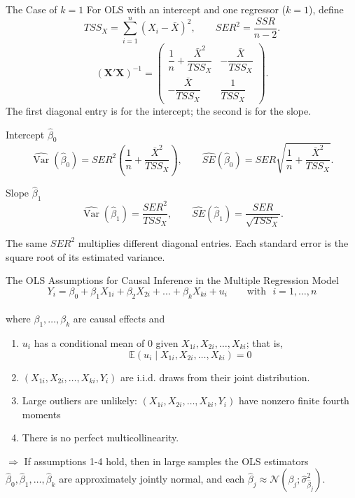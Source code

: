 \documentclass[notes,10pt, aspectratio=169]{beamer}
\begin{document}
\begin{frame}{The Case of $k=1$}
\footnotesize
{}
\setlength{\abovedisplayskip}{3pt}
\setlength{\belowdisplayskip}{3pt}
For OLS with an intercept and one regressor ($k=1$), define
\[
    TSS_X=\sum_{i=1}^n(X_i-\bar{X})^2,\qquad SER^2=\frac{SSR}{n-2}.
\]
\[
    (\mathbf{X}'\mathbf{X})^{-1}=
    \begin{pmatrix}
        \dfrac{1}{n}+\dfrac{\bar{X}^2}{TSS_X} & -\dfrac{\bar{X}}{TSS_X} \\[1pt]
        -\dfrac{\bar{X}}{TSS_X} & \dfrac{1}{TSS_X}
    \end{pmatrix}.
\]
The first diagonal entry is for the intercept; the second is for the slope.
\begin{block}{Intercept $\hat{\beta}_0$}
\[
    \widehat{\operatorname{Var}}(\hat{\beta}_0)=SER^2\left(\frac{1}{n}+\frac{\bar{X}^2}{TSS_X}\right),\qquad
    \widehat{SE}(\hat{\beta}_0)=SER\sqrt{\frac{1}{n}+\frac{\bar{X}^2}{TSS_X}}.
\]
\end{block}
\begin{block}{Slope $\hat{\beta}_1$}
\[
    \widehat{\operatorname{Var}}(\hat{\beta}_1)=\frac{SER^2}{TSS_X},\qquad
    \widehat{SE}(\hat{\beta}_1)=\frac{SER}{\sqrt{TSS_X}}.
\]
\end{block}
The same $SER^2$ multiplies different diagonal entries. Each standard error is the square root of its estimated variance.
\end{frame}

\begin{frame}{The OLS Assumptions for Causal Inference
in the Multiple Regression Model}
\begin{equation*}
    Y_i = \beta_{0} + \beta_1 X_{1i} + \beta_2 X_{2i} + ... + \beta_k X_{ki} + u_i \text{~~~~~~with~~} i=1,\dots, n
\end{equation*}\\
\vspace{.5cm}
where $\beta_1, \dots, \beta_k$ are causal effects and\vspace{.5cm}

\begin{enumerate}
    \item $u_i$ has a conditional mean of 0 given $X_{1i}, X_{2i}, \dots, X_{ki}$; that is,
    \begin{equation*}
        \mathbb{E}(u_i \mid X_{1i}, X_{2i}, \dots, X_{ki})=0
    \end{equation*}
    \item $(X_{1i}, X_{2i}, \dots, X_{ki}, Y_i)$ are i.i.d. draws from their joint distribution.
    \item Large outliers are unlikely: $(X_{1i}, X_{2i}, \dots, X_{ki}, Y_i)$ have nonzero finite fourth moments
    \item There is no perfect multicollinearity.
\end{enumerate}
\vspace{.5cm}
$\Rightarrow$ If assumptions 1-4 hold, then in large samples the OLS estimators $\hat{\beta}_0, \hat{\beta}_1, \dots, \hat{\beta}_k$ are approximately jointly normal, and each $\hat{\beta}_j\approx \mathcal{N}(\beta_j; \hat{\sigma}^2_{\hat{\beta}_j})$.
\end{frame}
\end{document}
